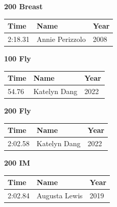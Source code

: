 \vspace{1.2em}
\noindent\begin{minipage}[t]{0.48\textwidth}
\centering
\textbf{\textcolor{teamprimary}{200 Breast}}\par
\vspace{0.5em}
\centering
\small
\renewcommand{\arraystretch}{1.0}
\setlength{\tabcolsep}{4pt}
\begin{tabular}{@{}p{1.8cm}p{3.0cm}p{1.0cm}@{}}
\toprule
\textbf{Time} & \textbf{Name} & \textbf{Year} \\
\midrule
2:18.31 & Annie Perizzolo & 2008 \\
\bottomrule
\end{tabular}
\end{minipage}
\hfill
\begin{minipage}[t]{0.48\textwidth}
\centering
\textbf{\textcolor{teamprimary}{100 Fly}}\par
\vspace{0.5em}
\centering
\small
\renewcommand{\arraystretch}{1.0}
\setlength{\tabcolsep}{4pt}
\begin{tabular}{@{}p{1.8cm}p{3.0cm}p{1.0cm}@{}}
\toprule
\textbf{Time} & \textbf{Name} & \textbf{Year} \\
\midrule
54.76 & Katelyn Dang & 2022 \\
\bottomrule
\end{tabular}
\end{minipage}
\vspace{1.2em}
\noindent\begin{minipage}[t]{0.48\textwidth}
\centering
\textbf{\textcolor{teamprimary}{200 Fly}}\par
\vspace{0.5em}
\centering
\small
\renewcommand{\arraystretch}{1.0}
\setlength{\tabcolsep}{4pt}
\begin{tabular}{@{}p{1.8cm}p{3.0cm}p{1.0cm}@{}}
\toprule
\textbf{Time} & \textbf{Name} & \textbf{Year} \\
\midrule
2:02.58 & Katelyn Dang & 2022 \\
\bottomrule
\end{tabular}
\end{minipage}
\hfill
\begin{minipage}[t]{0.48\textwidth}
\centering
\textbf{\textcolor{teamprimary}{200 IM}}\par
\vspace{0.5em}
\centering
\small
\renewcommand{\arraystretch}{1.0}
\setlength{\tabcolsep}{4pt}
\begin{tabular}{@{}p{1.8cm}p{3.0cm}p{1.0cm}@{}}
\toprule
\textbf{Time} & \textbf{Name} & \textbf{Year} \\
\midrule
2:02.84 & Augusta Lewis & 2019 \\
\bottomrule
\end{tabular}
\end{minipage}
